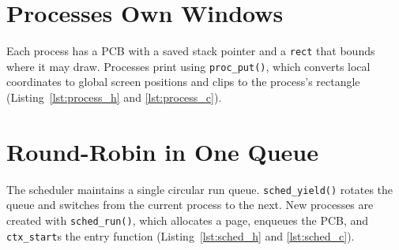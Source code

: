 \begin{figure}[H]
\centering

\end{figure}

\begin{figure}[H]
\centering

\end{figure}

\section{Processes Own Windows}

Each process has a PCB with a saved stack pointer and a \texttt{rect} that
bounds where it may draw. Processes print using \texttt{proc\_put()}, which
converts local coordinates to global screen positions and clips to the
process’s rectangle (Listing~\ref{lst:process_h} and \ref{lst:process_c}).

\begin{figure}[H]
\centering

\end{figure}

\begin{figure}[H]
\centering

\end{figure}

\section{Round-Robin in One Queue}

The scheduler maintains a single circular run queue. \texttt{sched\_yield()}
rotates the queue and switches from the current process to the next. New
processes are created with \texttt{sched\_run()}, which allocates a page,
enqueues the PCB, and \texttt{ctx\_start}s the entry function (Listing~\ref{lst:sched_h}
and \ref{lst:sched_c}).

\begin{figure}[H]
\centering

\end{figure}

